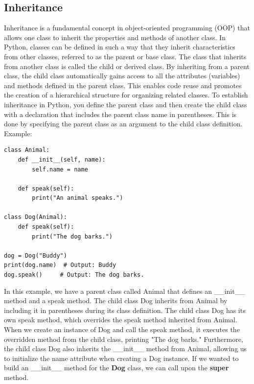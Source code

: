\documentclass{report}
\begin{document}
    \subsection{Inheritance}
    \bigbreak \noindent 
    Inheritance is a fundamental concept in object-oriented programming (OOP) that allows one class to inherit the properties and methods of another class. In Python, classes can be defined in such a way that they inherit characteristics from other classes, referred to as the parent or base class.
    \bigbreak \noindent 
    The class that inherits from another class is called the child or derived class. By inheriting from a parent class, the child class automatically gains access to all the attributes (variables) and methods defined in the parent class. This enables code reuse and promotes the creation of a hierarchical structure for organizing related classes.
    \bigbreak \noindent 
    To establish inheritance in Python, you define the parent class and then create the child class with a declaration that includes the parent class name in parentheses. This is done by specifying the parent class as an argument to the child class definition.
    \bigbreak \noindent 
    Example:
    \begin{verbatim}
class Animal:
    def __init__(self, name):
        self.name = name

    def speak(self):
        print("An animal speaks.")

class Dog(Animal):
    def speak(self):
        print("The dog barks.")

dog = Dog("Buddy")
print(dog.name)  # Output: Buddy
dog.speak()     # Output: The dog barks.
    \end{verbatim}
    \bigbreak \noindent 
    In this example, we have a parent class called Animal that defines an \_\_init\_\_ method and a speak method. The child class Dog inherits from Animal by including it in parentheses during its class definition.
    \bigbreak \noindent 
    The child class Dog has its own speak method, which overrides the speak method inherited from Animal. When we create an instance of Dog and call the speak method, it executes the overridden method from the child class, printing "The dog barks."
    \bigbreak \noindent 
    Furthermore, the child class Dog also inherits the \_\_init\_\_ method from Animal, allowing us to initialize the name attribute when creating a Dog instance.
    \bigbreak \noindent 
    If we wanted to build an \_\_init\_\_ method for the \textbf{Dog} class, we can call upon the \textbf{super} method.
    \bigbreak \noindent 
\end{document}
